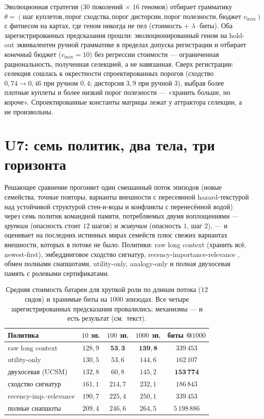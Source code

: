 \documentclass{article}
\begin{document}
Эволюционная стратегия ($30$ поколений $\times$ $16$ геномов)
отбирает грамматику $\theta = (\text{шаг куплетов},
\text{порог сходства}, \text{порог дисторсии},
\text{порог полезности}, \text{бюджет } v_{\max})$ с фитнесом на
картах, где геном никогда не пел (стоимость $+$ $\lambda\cdot$биты).
Оба зарегистрированных предсказания прошли: эволюционированный геном
на hold-out эквивалентен ручной грамматике в пределах допуска
регистрации и отбирает \emph{конечный} бюджет ($v_{\max} = 10$) без
регрессии стоимости --- ограниченная рациональность, полученная
селекцией, а не навязанная. Сверх регистрации: селекция сошлась к
окрестности спроектированных порогов (сходство $0{,}74 \to 0{,}46$
при ручном $0{,}4$; дисторсия $3{,}9$ при ручной $3$), выбрав более
плотные куплеты и более низкий порог полезности --- «хранить больше,
но короче». Спроектированные константы матрицы лежат у аттрактора
селекции, а не произвольны.

\section{U7: семь политик, два тела, три горизонта}
\label{sec:u7}

Решающее сравнение прогоняет один смешанный поток эпизодов (новые
семейства, точные повторы, варианты внешности с пересеянной
hazard-текстурой над устойчивой структурой стен-и-воды и конфликты с
перенесённой водой) через семь политик командной памяти, потребляемых
двумя воплощениями --- \emph{хрупким} (опасность стоит $12$ шагов) и
\emph{живучим} (опасность $1$, шаг $2$), --- и оценивает на последних
истинных мирах семейств плюс свежих вариантах внешности, которых в
потоке не было. Политики: raw long context (хранить всё,
newest-first), эмбеддинговое сходство сигнатур,
recency-importance-relevance \citep{genagents2023}, обмен полными
снапшотами, utility-only, analogy-only и полная двухосевая память с
ролевыми сертификатами.

\begin{table}[h]
\centering
\caption{Средняя стоимость батареи для хрупкой роли по длинам потока
($12$ сидов) и хранимые биты на $1000$ эпизодах. Все четыре
зарегистрированных предсказания провалились; механизмы --- и есть
результат (см.\ текст).}
\label{tab:u7}
\small
\begin{tabular}{lcccc}
\toprule
Политика & $10$ эп. & $100$ эп. & $1000$ эп. & биты @$1000$ \\
\midrule
raw long context & $128{,}9$ & $\mathbf{53{,}3}$ & $\mathbf{139{,}8}$ & $339\,453$ \\
utility-only & $130{,}5$ & $53{,}6$ & $144{,}6$ & $162\,107$ \\
двухосевая (UCSM) & $132{,}8$ & $60{,}8$ & $145{,}2$ & $\mathbf{153\,774}$ \\
сходство сигнатур & $161{,}1$ & $214{,}7$ & $232{,}1$ & $186\,843$ \\
recency-imp.-relevance & $190{,}7$ & $225{,}4$ & $250{,}1$ & $339\,453$ \\
полные снапшоты & $209{,}4$ & $246{,}6$ & $264{,}5$ & $5\,198\,886$ \\
\bottomrule
\end{tabular}
\end{table}
\end{document}
